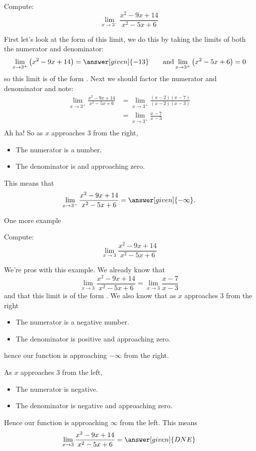\documentclass{ximera}
\begin{document}
\begin{example}
  Compute:
  \[
  \lim_{x\to 3^-} \frac{x^2-9x+14}{x^2-5x+6}
  \]
  \begin{explanation}
    First let's look at the form of this limit, we do this by taking the limits of both the numerator and denominator:
    \[
    \lim_{x\to 3^+} \left(x^2-9x+14\right) = \answer[given]{-13}\qquad\text{and}\lim_{x\to3^+}\left(x^2-5x+6\right) = 0
    \]
    so this limit is of the form \numOverZero. Next we should factor the numerator and denominator and note:
    \begin{align*}
      \lim_{x\to 3^+}\frac{x^2-9x+14}{x^2-5x+6} &= \lim_{x\to 3^+}\frac{(x-2)(x-7)}{(x-2)(x-3)}\\
      &= \lim_{x\to 3^+}\frac{x-7}{x-3}\\
    \end{align*}
    Ah ha! So as $x$ approaches $3$ from the right,
    \begin{itemize}
    \item The numerator is a  number. 
    \item The denominator is  and approaching zero.
    \end{itemize}
    This means that
    \[
    \lim_{x\to 3^-} \frac{x^2-9x+14}{x^2-5x+6} = \answer[given]{-\infty}.
    \]
   \end{explanation}
\end{example}

One more example

\begin{example}
  Compute:
  \[
  \lim_{x\to 3} \frac{x^2-9x+14}{x^2-5x+6}
  \]
  \begin{explanation}
    We're pros with this example. We already know that
    \[
    \lim_{x\to 3} \frac{x^2-9x+14}{x^2-5x+6} = \lim_{x\to
      3}\frac{x-7}{x-3}
    \]
    and that this limit is of the form \numOverZero.
    We also know that as $x$ approaches $3$ from the right
    \begin{itemize}
    \item The numerator is a negative number. 
    \item The denominator is positive and approaching zero.
    \end{itemize}
    hence our function is approaching $-\infty$ from the right.
    
    As $x$ approaches $3$ from the left,
    \begin{itemize}
    \item The numerator is negative.
    \item The denominator is negative and approaching zero.
    \end{itemize}
    Hence our function is approaching $\infty$ from the left.
    This means
    \[
    \lim_{x\to 3} \frac{x^2-9x+14}{x^2-5x+6} = \answer[given]{DNE}
    \]
  \end{explanation}
\end{example}
\end{document}
